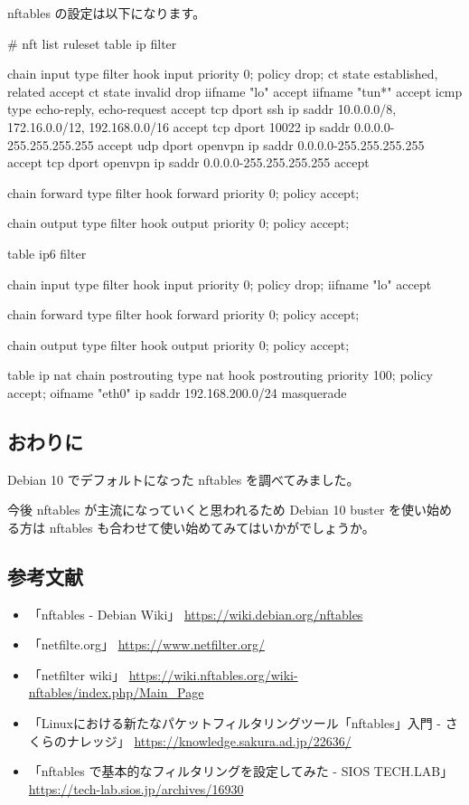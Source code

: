 \documentclass[mingoth,a4paper]{jsarticle}
\begin{document}
nftables の設定は以下になります。

\begin{commandline}
# nft list ruleset
table ip filter {
    chain input {
        type filter hook input priority 0; policy drop;
        ct state { established, related } accept
        ct state { invalid } drop
        iifname "lo" accept
        iifname "tun*" accept
        icmp type { echo-reply, echo-request } accept
        tcp dport ssh ip saddr { 10.0.0.0/8, 172.16.0.0/12, 192.168.0.0/16 } accept
        tcp dport 10022 ip saddr { 0.0.0.0-255.255.255.255 } accept
        udp dport openvpn ip saddr { 0.0.0.0-255.255.255.255 } accept
        tcp dport openvpn ip saddr { 0.0.0.0-255.255.255.255 } accept
    }

    chain forward {
        type filter hook forward priority 0; policy accept;
    }

    chain output {
        type filter hook output priority 0; policy accept;
    }
}
table ip6 filter {
    chain input {
        type filter hook input priority 0; policy drop;
        iifname "lo" accept
    }

    chain forward {
        type filter hook forward priority 0; policy accept;
    }

    chain output {
        type filter hook output priority 0; policy accept;
    }
}  
table ip nat {
    chain postrouting {
        type nat hook postrouting priority 100; policy accept;
        oifname "eth0" ip saddr 192.168.200.0/24 masquerade
    }
}
\end{commandline}


\subsection{おわりに}

Debian 10 でデフォルトになった nftables を調べてみました。

今後 nftables が主流になっていくと思われるため Debian 10 buster を使い始める方は nftables も合わせて使い始めてみてはいかがでしょうか。 


\subsection{参考文献}

\begin{itemize}
\item 「nftables - Debian Wiki」 \url{https://wiki.debian.org/nftables}
\item 「netfilte.org」 \url{https://www.netfilter.org/}
\item 「netfilter wiki」 \url{https://wiki.nftables.org/wiki-nftables/index.php/Main_Page}
\item 「Linuxにおける新たなパケットフィルタリングツール「nftables」入門 - さくらのナレッジ」 \url{https://knowledge.sakura.ad.jp/22636/}
\item 「nftables で基本的なフィルタリングを設定してみた - SIOS TECH.LAB」 \url{https://tech-lab.sios.jp/archives/16930}
\end{itemize}
\end{document}
